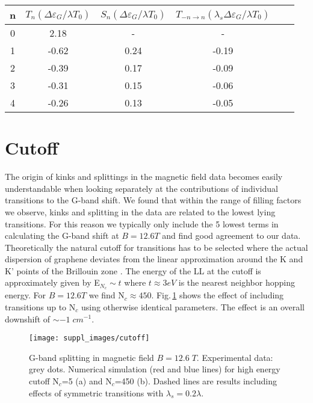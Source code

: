 \documentclass[pra,aps,superscriptaddress,preprint]{revtex4-1}
\begin{document}
\begin{center}
\begin{tabular}{|c|c|c|c|c|c|}
\hline
n &$T_n \left(\Delta\varepsilon_G / \lambda T_0 \right)$ & $S_n \left(\Delta\varepsilon_G / \lambda T_0 \right)$ & $T_{-n\rightarrow n}\left(\lambda_s \Delta \varepsilon_G / \lambda T_0\right)$ \\\hline
0 & 2.18 & - & - \\\hline
1 &-0.62 & 0.24 &-0.19 \\\hline
2 &-0.39 & 0.17 & -0.09 \\\hline
3 &-0.31 & 0.15 & -0.06 \\\hline
4 &-0.26 & 0.13 & -0.05 \\\hline
\hline
\end{tabular}
\end{center}


\newpage
\section{Cutoff}

The origin of kinks and splittings in the magnetic field data becomes easily understandable when looking separately at the contributions of individual transitions to the G-band shift. We found that within the range of filling factors we observe, kinks and splitting in the data are related to the lowest lying transitions. For this reason we typically only include the 5 lowest terms in calculating the G-band shift at $B=12.6T$ and find good agreement to our data.    
Theoretically the natural cutoff for transitions has to be selected where the actual dispersion of graphene deviates from the linear approximation around the K and K' points of the Brillouin zone \cite{goerbig2011electronic}. The energy of the LL at the cutoff is approximately given by E$_{N_c} \sim t$ where $t\approx 3eV$ is the nearest neighbor hopping energy. For $B=12.6T$ we find N$_c\approx 450$. Fig.\,\ref{cutoff} shows the effect of including transitions up to N$_c$ using otherwise identical parameters. The effect is an overall downshift of $\sim -1\; cm^{-1}$.  

\begin{figure}[h!]
   \texttt{[image: suppl\_images/cutoff]}
   \caption{\label{cutoff}G-band splitting in magnetic field $B=12.6 \; T$. Experimental data: grey dots. Numerical simulation (red and blue lines) for high energy cutoff N$_c$=5 (a) and N$_c$=450 (b). Dashed lines are results including effects of symmetric transitions with $\lambda_s=0.2\lambda$.}
\end{figure}
\end{document}
